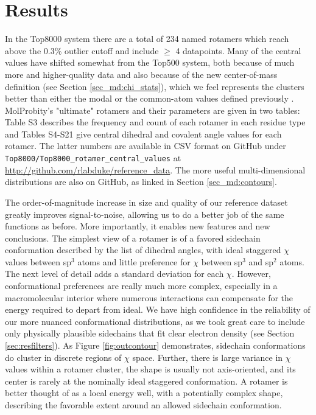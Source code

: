 \section{Results}
In the Top8000 system there are a total of 234 named rotamers which reach above the 0.3\% outlier cutoff and include $\ge$ 4 datapoints. Many of the central values have shifted somewhat from the Top500 system, both because of much more and higher-quality data and also because of the new center-of-mass definition (see Section \ref{sec_md:chi_stats}), which we feel represents the clusters better than either the modal or the common-atom values defined previously \cite{lovell2000penultimate}. MolProbity's "ultimate" rotamers and their parameters are given in two tables: Table S3 describes the frequency and count of each rotamer in each residue type and Tables S4-S21 give central dihedral and covalent angle values for each rotamer. The latter numbers are available in CSV format on GitHub under \texttt{Top8000/Top8000\_rotamer\_central\_values} at \url{http://github.com/rlabduke/reference_data}. The more useful multi-dimensional distributions are also on GitHub, as linked in Section \ref{sec_md:contours}.

The order-of-magnitude increase in size and quality of our reference dataset greatly improves signal-to-noise, allowing us to do a better job of the same functions as before. More importantly, it enables new features and new conclusions. The simplest view of a rotamer is of a favored sidechain conformation described by the list of dihedral angles, with ideal staggered $\chi$ values between sp$^{3}$ atoms and little preference for $\chi$ between sp$^{3}$ and sp$^{2}$ atoms. The next level of detail adds a standard deviation for each $\chi$. However, conformational preferences are really much more complex, especially in a macromolecular interior where numerous interactions can compensate for the energy required to depart from ideal. We have high confidence in the reliability of our more nuanced conformational distributions, as we took great care to include only physically plausible sidechains that fit clear electron density (see Section \ref{sec:resfilters}). As Figure \ref{fig:outcontour} demonstrates, sidechain conformations do cluster in discrete regions of $\chi$ space. Further, there is large variance in $\chi$ values within a rotamer cluster, the shape is usually not axis-oriented, and its center is rarely at the nominally ideal staggered conformation. A rotamer is better thought of as a local energy well, with a potentially complex shape, describing the favorable extent around an allowed sidechain conformation.

